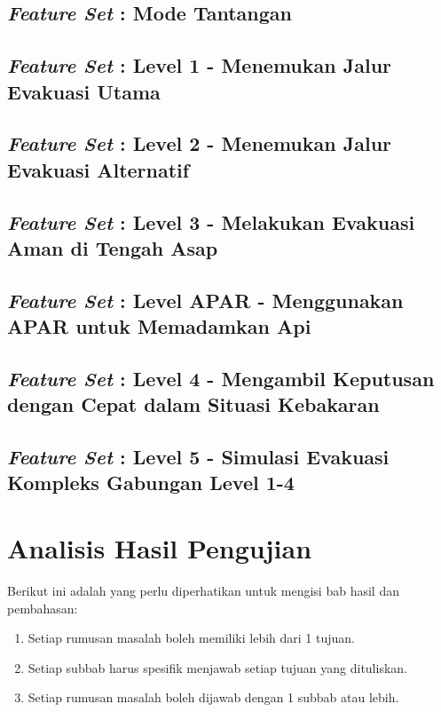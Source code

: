 \subsection{\textit{Feature Set} : Mode Tantangan}

\subsection{\textit{Feature Set} : Level 1 - Menemukan Jalur Evakuasi Utama}

\subsection{\textit{Feature Set} : Level 2 - Menemukan Jalur Evakuasi Alternatif}

\subsection{\textit{Feature Set} : Level 3 - Melakukan Evakuasi Aman di Tengah Asap }
\subsection{\textit{Feature Set} : Level APAR - Menggunakan APAR untuk Memadamkan Api}
\subsection{\textit{Feature Set} : Level 4 - Mengambil Keputusan dengan Cepat dalam Situasi Kebakaran}
\subsection{\textit{Feature Set} : Level 5 - Simulasi Evakuasi Kompleks Gabungan Level 1-4}

\section{Analisis Hasil Pengujian}



Berikut ini adalah yang perlu diperhatikan untuk mengisi bab hasil dan pembahasan:

\begin{enumerate}
	\item Setiap rumusan masalah boleh memiliki lebih dari 1 tujuan.
	\item Setiap subbab harus spesifik menjawab setiap tujuan yang dituliskan.
	\item Setiap rumusan masalah boleh dijawab dengan 1 subbab atau lebih.
\end{enumerate}

